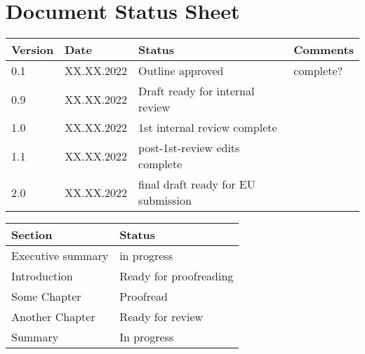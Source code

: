 \documentclass[a4paper,11pt,captions=nooneline,parskip=half]{scrreprt}
\begin{document}
	\hypersetup{pageanchor=false}
	
	\hypersetup{pageanchor=true}

	
	\clearpage
	\section*{Document Status Sheet}
	\begin{tabularx}{\textwidth}{| l | l | l | >{\raggedright\let\\\tabularnewline}X |}
		\hline
		\textbf{Version} & \textbf{Date} & \textbf{Status} & \textbf{Comments}\\
		\hline
		0.1 & XX.XX.2022 & Outline approved & complete?\\
				\hline
		0.9 & XX.XX.2022 & Draft ready for internal review & \\
		\hline
		1.0 & XX.XX.2022 & 1st internal review complete & \\
        \hline
        		1.1 & XX.XX.2022 & post-1st-review edits complete & \\
        \hline
		2.0 & XX.XX.2022 & final draft ready for EU submission & \\
		\hline
	\end{tabularx}
	\vfill
	\begin{tabularx}{\textwidth}{| l  | >{\raggedright\let\\\tabularnewline}X |}
		\hline
		\textbf{Section} & \textbf{Status} \\
		\hline
		Executive summary & {\color{red} in progress }\\ 
		\hline
		Introduction & {\color{orange} Ready for proofreading}\\
		\hline
		\hline
		Some Chapter & {\color{blue} Proofread}\\
		\hline
		\hline
		Another Chapter & {\color{green}Ready for review}\\
		
		\hline
		\hline
		Summary & {\color{red} In progress}\\
		\hline
	\end{tabularx}
	\clearpage

	
	\clearpage
	\tableofcontents
	\iftotalfigures
	\clearpage
	\listoffigures
	\fi
	\iftotaltables
	\clearpage
	\listoftables
	\fi
	\listoffixmes
	
\end{document}
